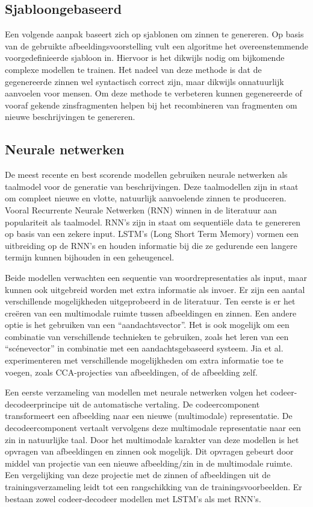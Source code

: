 \subsection{Sjabloongebaseerd}
Een volgende aanpak baseert zich op sjablonen om zinnen te genereren. Op basis van de gebruikte afbeeldingsvoorstelling vult een algoritme het overeenstemmende voorgedefinieerde sjabloon in\cite{Yang2011}. Hiervoor is het dikwijls nodig om bijkomende complexe modellen te trainen\cite{Elliott2013}. Het nadeel van deze methode is dat de gegenereerde zinnen wel syntactisch correct zijn, maar dikwijls onnatuurlijk aanvoelen voor mensen. Om deze methode te verbeteren kunnen gegenereerde of vooraf gekende zinsfragmenten helpen bij het recombineren van fragmenten om nieuwe beschrijvingen te genereren\cite{Mitchell2012,Kuznetsova2012}. 

\subsection{Neurale netwerken}
De meest recente en best scorende modellen gebruiken neurale netwerken als taalmodel voor de generatie van beschrijvingen. Deze taalmodellen zijn in staat om compleet nieuwe en vlotte, natuurlijk aanvoelende zinnen te produceren. Vooral Recurrente Neurale Netwerken (RNN)\cite{Mikolov2010} winnen in de literatuur aan populariteit als taalmodel. RNN's zijn in staat om sequenti\"ele data te genereren op basis van een zekere input. LSTM's (Long Short Term Memory)\cite{SeppHochreiter1997} vormen een uitbreiding op de RNN's en houden informatie bij die ze gedurende een langere termijn kunnen bijhouden in een geheugencel.

Beide modellen verwachten een sequentie van woordrepresentaties als input, maar kunnen ook uitgebreid worden met extra informatie als invoer. Er zijn een aantal verschillende mogelijkheden uitgeprobeerd in de literatuur. Ten eerste is er het cre\"eren van een multimodale ruimte tussen afbeeldingen en zinnen\cite{Kiros2014,Socher2014}. Een andere optie is het gebruiken van een ``aandachtsvector''\cite{Xu2015}. Het is ook mogelijk om een combinatie van verschillende technieken te gebruiken, zoals het leren van een ``sc\'enevector'' in combinatie met een aandachtsgebaseerd systeem\cite{Jin2015}. Jia et al. experimenteren met verschillende mogelijkheden om extra informatie toe te voegen, zoals CCA-projecties van afbeeldingen, of de afbeelding zelf\cite{Fernando2015}.

Een eerste verzameling van modellen met neurale netwerken volgen het codeer-decodeerprincipe uit de automatische vertaling\cite{Kiros2014}. De codeercomponent transformeert een afbeelding naar een nieuwe (multimodale) representatie. De decodeercomponent vertaalt vervolgens deze multimodale representatie naar een zin in natuurlijke taal. Door het multimodale karakter van deze modellen is het opvragen van afbeeldingen en zinnen ook mogelijk. Dit opvragen gebeurt door middel van projectie van een nieuwe afbeelding/zin in de multimodale ruimte. Een vergelijking van deze projectie met de zinnen of afbeeldingen uit de trainingsverzameling leidt tot een rangschikking van de trainingsvoorbeelden. Er bestaan zowel codeer-decodeer modellen met LSTM's\cite{Kiros2014} als met RNN's\cite{Karpathy2014,Mao2014a}.

